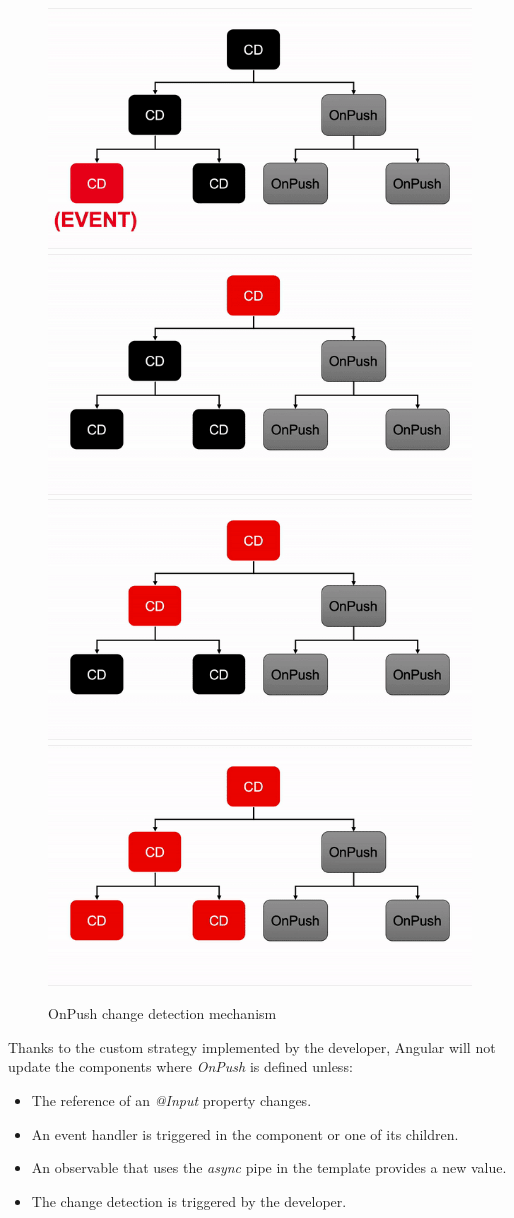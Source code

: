 \begin{figure}[h!]
    \caption{OnPush change detection mechanism}
    \centering
    \includegraphics[width=.49\textwidth]{img/onpush-cycle1.png} 
    \includegraphics[width=.49\textwidth]{img/onpush-cycle2.png} 
    \includegraphics[width=.49\textwidth]{img/onpush-cycle3.png} 
    \includegraphics[width=.49\textwidth]{img/onpush-cycle4.png} 
\end{figure}

Thanks to the custom strategy implemented by the developer, Angular will not update the components where \emph{OnPush} is defined unless:
\begin{itemize}
    \item The reference of an \emph{@Input} property changes.
    \item An event handler is triggered in the component or one of its children.
    \item An observable that uses the \emph{async} pipe in the template provides a new value.
    \item The change detection is triggered by the developer.
\end{itemize}
